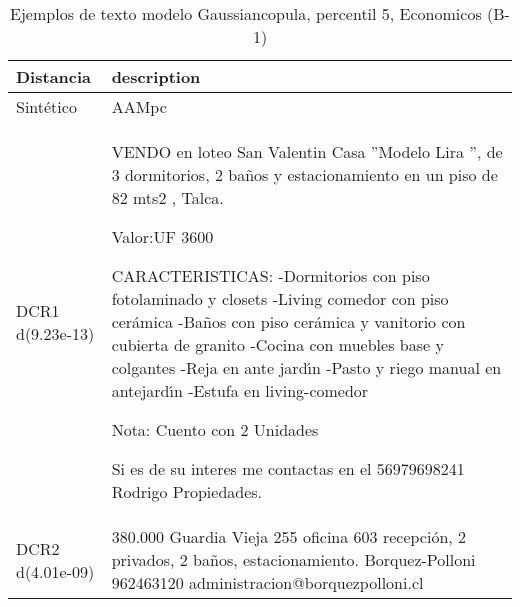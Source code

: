 \begin{table}[H]
\centering
\fontsize{10}{14}\selectfont
\caption{Ejemplos de texto modelo Gaussiancopula, percentil 5, Economicos (B-1)}
\label{table-example-economicos-b-1-gaussiancopula-5p-text}
\begin{tabular}{|l|m{35em}|}
\hline
\rowcolor[gray]{0.8}
Distancia & description \\
\hline Sintético & AAMpc \\
\hline DCR1 d(9.23e-13) & VENDO en loteo San Valentin Casa ''Modelo Lira '', de 3 dormitorios, 2 ba\~nos y estacionamiento en un piso de 82 mts2 , Talca.

Valor:UF 3600

CARACTERISTICAS:
-Dormitorios con piso fotolaminado y closets
-Living comedor con piso cer\'amica
-Ba\~nos con piso cer\'amica y vanitorio con cubierta de granito
-Cocina con muebles base y colgantes
-Reja en ante jard{\'\i}n
-Pasto y riego manual en antejard{\'\i}n
-Estufa en living-comedor
 

Nota: Cuento con 2 Unidades

Si es de su interes me contactas en el 56979698241 Rodrigo Propiedades. \\
\hline DCR2 d(4.01e-09) & 380.000 Guardia Vieja 255 oficina 603 recepci\'on, 2 privados, 2 ba\~nos, estacionamiento. Borquez-Polloni 962463120 administracion@borquezpolloni.cl \\
\hline
\end{tabular}
\end{table}
